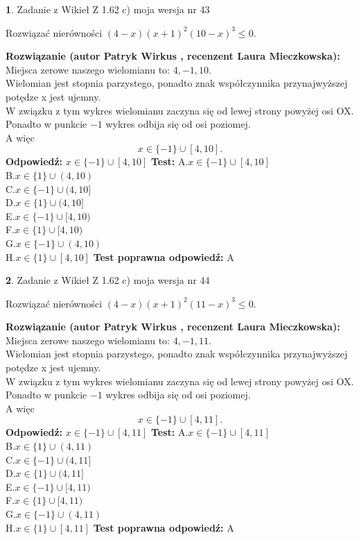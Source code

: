 \documentclass[12pt, a4paper]{article}
\theoremstyle{definition} %
\newtheorem{zad}{}
\newcommand{\zadStart}[1]{\begin{zad}#1\newline}
\newcommand{\zadStop}{\end{zad}}
\newcommand{\rozwStart}[2]{\noindent \textbf{Rozwiązanie (autor #1 , recenzent #2): }\newline}
\newcommand{\rozwStop}{\newline}
\newcommand{\odpStart}{\noindent \textbf{Odpowiedź:}\newline}
\newcommand{\odpStop}{\newline}
\newcommand{\testStart}{\noindent \textbf{Test:}\newline}
\newcommand{\testStop}{\newline}
\newcommand{\kluczStart}{\noindent \textbf{Test poprawna odpowiedź:}\newline}
\newcommand{\kluczStop}{\newline}
\begin{document}
\zadStart{Zadanie z Wikieł Z 1.62 c) moja wersja nr 43}

Rozwiązać nierówności $(4-x)(x+1)^{2}(10-x)^{3}\le0$.
\zadStop
\rozwStart{Patryk Wirkus}{Laura Mieczkowska}
Miejsca zerowe naszego wielomianu to: $4, -1, 10$.\\
Wielomian jest stopnia parzystego, ponadto znak współczynnika przy\linebreak najwyższej potędze x jest ujemny.\\ W związku z tym wykres wielomianu zaczyna się od lewej strony powyżej osi OX.\\
Ponadto w punkcie $-1$ wykres odbija się od osi poziomej.\\
A więc $$x \in \{-1\} \cup [4,10].$$
\rozwStop
\odpStart
$x \in \{-1\} \cup [4,10]$
\odpStop
\testStart
A.$x \in \{-1\} \cup [4,10]$\\
B.$x \in \{1\} \cup (4,10)$\\
C.$x \in \{-1\} \cup (4,10]$\\
D.$x \in \{1\} \cup (4,10]$\\
E.$x \in \{-1\} \cup [4,10)$\\
F.$x \in \{1\} \cup [4,10)$\\
G.$x \in \{-1\} \cup (4,10)$\\
H.$x \in \{1\} \cup [4,10]$
\testStop
\kluczStart
A
\kluczStop



\zadStart{Zadanie z Wikieł Z 1.62 c) moja wersja nr 44}

Rozwiązać nierówności $(4-x)(x+1)^{2}(11-x)^{3}\le0$.
\zadStop
\rozwStart{Patryk Wirkus}{Laura Mieczkowska}
Miejsca zerowe naszego wielomianu to: $4, -1, 11$.\\
Wielomian jest stopnia parzystego, ponadto znak współczynnika przy\linebreak najwyższej potędze x jest ujemny.\\ W związku z tym wykres wielomianu zaczyna się od lewej strony powyżej osi OX.\\
Ponadto w punkcie $-1$ wykres odbija się od osi poziomej.\\
A więc $$x \in \{-1\} \cup [4,11].$$
\rozwStop
\odpStart
$x \in \{-1\} \cup [4,11]$
\odpStop
\testStart
A.$x \in \{-1\} \cup [4,11]$\\
B.$x \in \{1\} \cup (4,11)$\\
C.$x \in \{-1\} \cup (4,11]$\\
D.$x \in \{1\} \cup (4,11]$\\
E.$x \in \{-1\} \cup [4,11)$\\
F.$x \in \{1\} \cup [4,11)$\\
G.$x \in \{-1\} \cup (4,11)$\\
H.$x \in \{1\} \cup [4,11]$
\testStop
\kluczStart
A
\kluczStop
\end{document}
